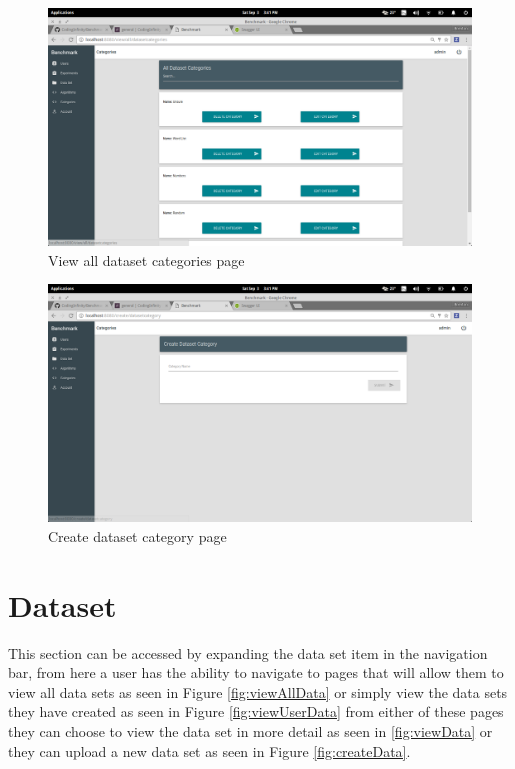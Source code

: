 \documentclass[11pt,a4paper]{article}
\begin{document}
\begin{figure}[H]
	\begin{center}
		\includegraphics[scale=0.3]{../Images/User Manual/View Dataset Categories.png}
		\caption{View all dataset categories page}
		\label{fig:viewDataCat}
	\end{center}  
\end{figure}
\begin{figure}[H]
	\begin{center}
		\includegraphics[scale=0.3]{../Images/User Manual/Create Dataset Category.png}
		\caption{Create dataset category page}
		\label{fig:createDataCat}
	\end{center}  
\end{figure}

\section{Dataset}
This section can be accessed by expanding the data set item in the navigation bar, from
here a user has the ability to navigate to pages that will allow them to view all data
sets as seen in Figure \ref{fig:viewAllData} or simply view the data sets they have
created as seen in Figure \ref{fig:viewUserData} from either of these pages they can choose
to view the data set in more detail as seen in \ref{fig:viewData} or they can upload a new
data set as seen in Figure \ref {fig:createData}.
\end{document}
